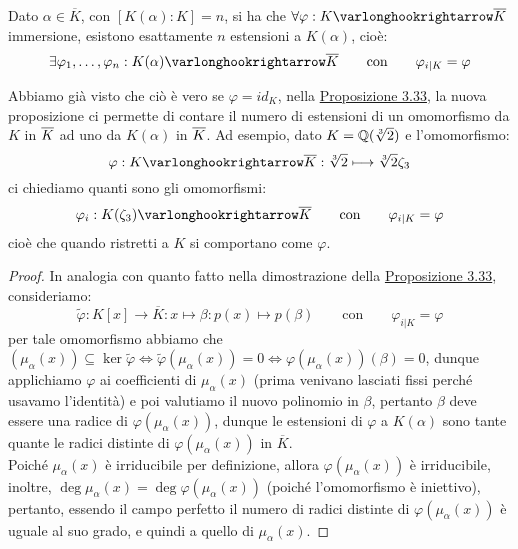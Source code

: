 \documentclass[11pt]{scrartcl}
\begin{document}
\begin{proposition}
    \label{3.37}
    Dato $\alpha \in \overline K$, con $[K(\alpha) : K] = n$, si ha che $\forall \varphi : K \varlonghookrightarrow \overline K$ immersione, esistono esattamente $n$ estensioni a $K(\alpha)$, cioè:
    \[ \exists \varphi_1,\ldots,\varphi_n : K(\alpha) \varlonghookrightarrow \overline K \qquad \text{con} \qquad \varphi_{i|K} = \varphi
        \]
\end{proposition}

\begin{remark}
    Abbiamo già visto che ciò è vero se $\varphi = id_K$, nella \hyperref[3.33]{Proposizione 3.33},
    la nuova proposizione ci permette di contare il numero di estensioni di un omomorfismo da $K$ in $\overline K$ ad uno da $K(\alpha)$ in $\overline K$.
    Ad esempio, dato $K = \mathbb Q(\sqrt[3]{2})$ e l'omomorfismo:
    \[ \varphi : K \varlonghookrightarrow \ol K : \sqrt[3]{2} \longmapsto \sqrt[3]{2}\zeta_3
        \]
    ci chiediamo quanti sono gli omomorfismi:
    \[ \varphi_i : K(\zeta_3) \varlonghookrightarrow \ol K \qquad \text{con} \qquad \varphi_{i|K} = \varphi
        \]
    cioè che quando ristretti a $K$ si comportano come $\varphi$.
\end{remark}

\begin{proof}
    In analogia con quanto fatto nella dimostrazione della \hyperref[3.33]{Proposizione 3.33}, consideriamo:
    \[ \widetilde{\varphi} : K[x] \longrightarrow \overline K : x \longmapsto \beta : p(x) \longmapsto p(\beta) \qquad \text{con} \qquad \varphi_{i|K} = \varphi
        \]
    per tale omomorfismo abbiamo che $(\mu_\alpha(x)) \subseteq \ker \widetilde{\varphi} \iff \widetilde{\varphi}(\mu_\alpha(x)) = 0 \iff \varphi(\mu_\alpha(x))(\beta) = 0$, 
    dunque applichiamo $\varphi$ ai coefficienti di $\mu_\alpha(x)$ (prima venivano lasciati fissi perché usavamo l'identità) e poi valutiamo il nuovo polinomio in $\beta$, pertanto $\beta$
    deve essere una radice di $\varphi(\mu_\alpha(x))$, dunque le estensioni di $\varphi$ a $K(\alpha)$ sono tante quante le radici distinte di $\varphi(\mu_\alpha(x))$ in $\overline K$. \\
    Poiché $\mu_\alpha(x)$ è irriducibile per definizione, allora $\varphi(\mu_\alpha(x))$ è irriducibile, inoltre, $\deg \mu_\alpha(x) = \deg \varphi(\mu_\alpha(x))$ (poiché l'omomorfismo è
    iniettivo), pertanto, essendo il campo perfetto il numero di radici distinte di $\varphi(\mu_\alpha(x))$ è uguale al suo grado, e quindi a quello di $\mu_\alpha(x)$.
\end{proof}
\end{document}
